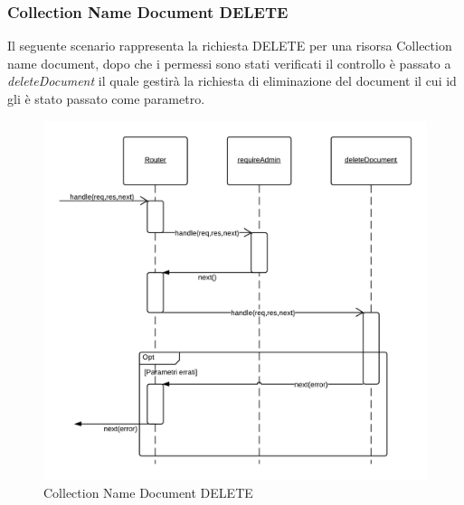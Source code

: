 \subsubsection{Collection Name Document DELETE}
Il seguente scenario rappresenta la richiesta DELETE per una risorsa Collection name document, dopo che i permessi sono stati verificati il controllo è passato a \emph{deleteDocument} il quale gestirà la richiesta di eliminazione del document il cui id gli è stato passato come parametro.
\begin{figure}[H]
	\begin{center} 
		\includegraphics[scale=0.20]{scenari/Collection Name Document DELETE.png} 
		\caption{Collection Name Document DELETE}
	\end{center} 
\end{figure}

